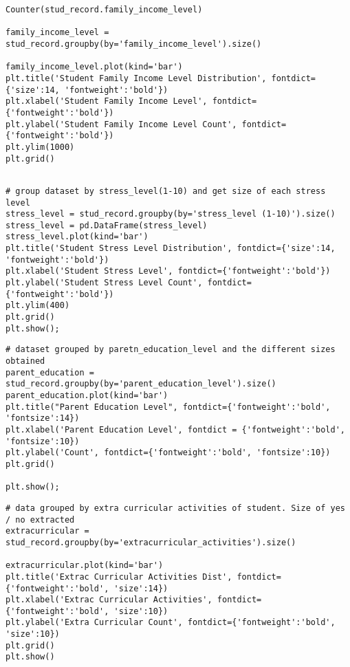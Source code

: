\label{code:family_income}
\begin{verbatim}
Counter(stud_record.family_income_level)

family_income_level = stud_record.groupby(by='family_income_level').size()

family_income_level.plot(kind='bar')
plt.title('Student Family Income Level Distribution', fontdict={'size':14, 'fontweight':'bold'})
plt.xlabel('Student Family Income Level', fontdict={'fontweight':'bold'})
plt.ylabel('Student Family Income Level Count', fontdict={'fontweight':'bold'})
plt.ylim(1000)
plt.grid()
\end{verbatim}



\label{code:stress_level}
\begin{verbatim}
	
# group dataset by stress_level(1-10) and get size of each stress level
stress_level = stud_record.groupby(by='stress_level (1-10)').size()
stress_level = pd.DataFrame(stress_level) 
stress_level.plot(kind='bar')
plt.title('Student Stress Level Distribution', fontdict={'size':14, 'fontweight':'bold'})
plt.xlabel('Student Stress Level', fontdict={'fontweight':'bold'})
plt.ylabel('Student Stress Level Count', fontdict={'fontweight':'bold'})
plt.ylim(400)
plt.grid()
plt.show();
\end{verbatim}


\label{code:parent_education}
\begin{verbatim}
# dataset grouped by paretn_education_level and the different sizes obtained
parent_education = stud_record.groupby(by='parent_education_level').size()
parent_education.plot(kind='bar')
plt.title("Parent Education Level", fontdict={'fontweight':'bold', 'fontsize':14})
plt.xlabel('Parent Education Level', fontdict = {'fontweight':'bold', 'fontsize':10})
plt.ylabel('Count', fontdict={'fontweight':'bold', 'fontsize':10})
plt.grid()

plt.show();
\end{verbatim}


\label{code:extra_curricular}
\begin{verbatim}
# data grouped by extra curricular activities of student. Size of yes / no extracted
extracurricular = stud_record.groupby(by='extracurricular_activities').size()

extracurricular.plot(kind='bar')
plt.title('Extrac Curricular Activities Dist', fontdict={'fontweight':'bold', 'size':14})
plt.xlabel('Extrac Curricular Activities', fontdict={'fontweight':'bold', 'size':10})
plt.ylabel('Extra Curricular Count', fontdict={'fontweight':'bold', 'size':10})
plt.grid()
plt.show()
\end{verbatim}


